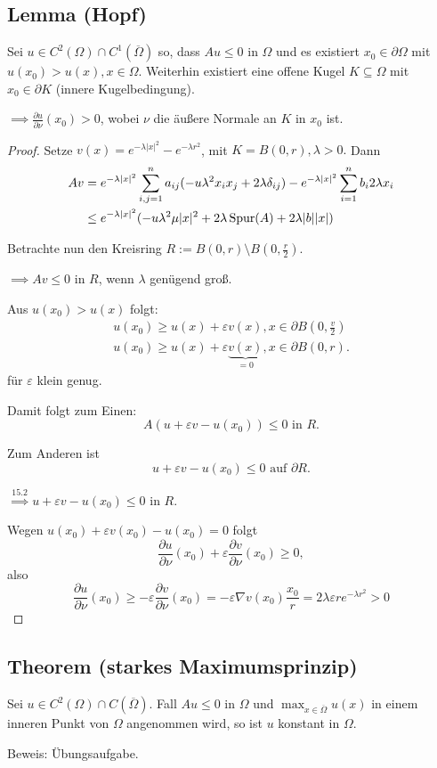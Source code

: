 \subsection{Lemma (Hopf)}

Sei $u \in C^2(\Omega)  \cap C^1(\overline\Omega)$ so, dass $A u \leq 0$ in $\Omega$ und es existiert $x_0 \in \partial\Omega$ mit $u(x_0) > u(x), x \in \Omega$.
Weiterhin existiert eine offene Kugel $K \subseteq \Omega$ mit $x_0 \in \partial K$ (innere Kugelbedingung).

$\implies \frac{\partial u}{\partial \nu}(x_0) > 0$, wobei $\nu$ die äußere Normale an $K$ in $x_0$ ist.

\begin{proof}
  Setze $v(x) = e^{-\lambda|x|^2} - e^{-\lambda r^2}$, mit $K = B(0,r), \lambda > 0.$
  Dann
  \begin{align*}
    Av &= e^{-\lambda |x|^2}  \sum_{i,j = 1}^n a_{ij} (- u\lambda^2 x_i x_j + 2 \lambda \delta_{ij}) - e^{- \lambda |x|^2} \sum_{i = 1}^n b_i 2 \lambda x_i \\
    &\leq e^{-\lambda|x|^2} (-u \lambda^2 \mu |x|^2 + 2 \lambda \operatorname{Spur}(A) + 2 \lambda |b||x|)
  \end{align*}

  Betrachte nun den Kreisring $R := B(0,r) \setminus B(0,\frac{r}{2})$.

  $\implies Av \leq 0$ in $R$, wenn $\lambda$ genügend groß.

  Aus $u(x_0) > u(x)$ folgt:
  \begin{align*}
    u(x_0) \geq u(x) + \varepsilon v(x), x \in \partial B(0,\frac{v}{2}) \\
    u(x_0) \geq u(x) + \varepsilon \underbrace{v(x)}_{=0}, x \in \partial B(0,r).
  \end{align*}
  für $\varepsilon$ klein genug.

  Damit folgt zum Einen:
  $$
  A(u + \varepsilon v - u(x_0)) \leq 0 \text{ in } R.
  $$

  Zum Anderen ist
  $$
  u + \varepsilon v - u(x_0) \leq 0 \text{ auf } \partial R.
  $$

  $\overset{\text{15.2}}{\implies} u + \varepsilon v - u(x_0) \leq 0$ in $R$.

  Wegen $u(x_0) + \varepsilon v(x_0) - u(x_0) = 0$ folgt
  $$
  \frac{\partial u}{\partial \nu}(x_0) + \varepsilon \frac{\partial v}{\partial \nu}(x_0) \geq 0,
  $$
  also 
  $$
  \frac{\partial u}{\partial \nu}(x_0) \geq -\varepsilon \frac{\partial v}{\partial \nu}(x_0) = -\varepsilon \nabla v(x_0) \frac{x_0}{r} = 2\lambda \varepsilon r e^{-\lambda r^2} > 0
  $$
\end{proof}

\subsection{Theorem (starkes Maximumsprinzip)}

Sei $u \in C^2(\Omega) \cap C(\overline\Omega)$.
Fall $A u \leq 0$ in $\Omega$ und $\max_{x \in \overline\Omega} u(x)$ in einem inneren Punkt von $\Omega$ angenommen wird, so ist $u$ konstant in $\Omega$.

Beweis: Übungsaufgabe.
